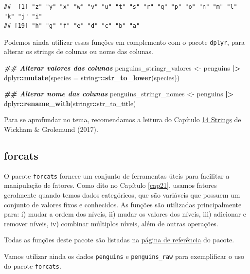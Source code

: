 \documentclass[
]{article}
\newenvironment{Shaded}{\begin{snugshade}}{\end{snugshade}}
\newcommand{\AttributeTok}[1]{\textcolor[rgb]{0.13,0.29,0.53}{#1}}
\newcommand{\DocumentationTok}[1]{\textcolor[rgb]{0.56,0.35,0.01}{\textbf{\textit{#1}}}}
\newcommand{\FunctionTok}[1]{\textcolor[rgb]{0.13,0.29,0.53}{\textbf{#1}}}
\newcommand{\NormalTok}[1]{#1}
\newcommand{\OtherTok}[1]{\textcolor[rgb]{0.56,0.35,0.01}{#1}}
\newcommand{\SpecialCharTok}[1]{\textcolor[rgb]{0.81,0.36,0.00}{\textbf{#1}}}
\begin{document}
\begin{verbatim}
##  [1] "z" "y" "x" "w" "v" "u" "t" "s" "r" "q" "p" "o" "n" "m" "l" "k" "j" "i"
## [19] "h" "g" "f" "e" "d" "c" "b" "a"
\end{verbatim}

Podemos ainda utilizar essas funções em complemento com o pacote \texttt{dplyr}, para alterar os strings de colunas ou nome das colunas.

\begin{Shaded}
\begin{Highlighting}[]
\DocumentationTok{\#\# Alterar valores das colunas}
\NormalTok{penguins\_stringr\_valores }\OtherTok{\textless{}{-}}\NormalTok{ penguins }\SpecialCharTok{|\textgreater{}} 
\NormalTok{    dplyr}\SpecialCharTok{::}\FunctionTok{mutate}\NormalTok{(}\AttributeTok{species =}\NormalTok{ stringr}\SpecialCharTok{::}\FunctionTok{str\_to\_lower}\NormalTok{(species))}

\DocumentationTok{\#\# Alterar nome das colunas}
\NormalTok{penguins\_stringr\_nomes }\OtherTok{\textless{}{-}}\NormalTok{ penguins }\SpecialCharTok{|\textgreater{}} 
\NormalTok{    dplyr}\SpecialCharTok{::}\FunctionTok{rename\_with}\NormalTok{(stringr}\SpecialCharTok{::}\NormalTok{str\_to\_title)}
\end{Highlighting}
\end{Shaded}

Para se aprofundar no tema, recomendamos a leitura do Capítulo \href{https://r4ds.had.co.nz/strings.html}{14 Strings} de Wickham \& Grolemund (2017).

\hypertarget{forcats}{%
\subsection{forcats}\label{forcats}}

O pacote \texttt{forcats} fornece um conjunto de ferramentas úteis para facilitar a manipulação de fatores. Como dito no Capítulo \ref{cap21}, usamos fatores geralmente quando temos dados categóricos, que são variáveis que possuem um conjunto de valores fixos e conhecidos. As funções são utilizadas principalmente para: i) mudar a ordem dos níveis, ii) mudar os valores dos níveis, iii) adicionar e remover níveis, iv) combinar múltiplos níveis, além de outras operações.

Todas as funções deste pacote são listadas na \href{https://forcats.tidyverse.org/reference/index.html}{página de referência} do pacote.

Vamos utilizar ainda os dados \texttt{penguins} e \texttt{penguins\_raw} para exemplificar o uso do pacote \texttt{forcats}.
\end{document}
